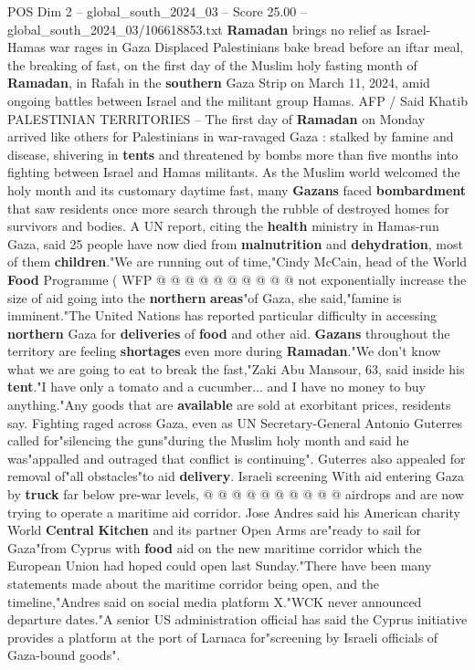 \begin{textsample}{POS Dim 2 – global\_south\_2024\_03 – Score 25.00 – global\_south\_2024\_03/106618853.txt}  \label{ex:f2_pos_016}
\textbf{Ramadan} brings no relief as Israel-Hamas war rages in Gaza Displaced Palestinians bake bread before an iftar meal, the breaking of fast, on the first day of the Muslim holy fasting month of \textbf{Ramadan}, in Rafah in the \textbf{southern} Gaza Strip on March 11, 2024, amid ongoing battles between Israel and the militant group Hamas.
AFP / Said Khatib PALESTINIAN TERRITORIES -- The first day of \textbf{Ramadan} on Monday arrived like others for Palestinians in war-ravaged Gaza : stalked by famine and disease, shivering in \textbf{tents} and threatened by bombs more than five months into fighting between Israel and Hamas militants.
As the Muslim world welcomed the holy month and its customary daytime fast, many \textbf{Gazans} faced \textbf{bombardment} that saw residents once more search through the rubble of destroyed homes for survivors and bodies.
A UN report, citing the \textbf{health} ministry in Hamas-run Gaza, said 25 people have now died from \textbf{malnutrition} and \textbf{dehydration}, most of them \textbf{children}."We are running out of time,"Cindy McCain, head of the World \textbf{Food} Programme ( WFP @ @ @ @ @ @ @ @ @ @ not exponentially increase the size of aid going into the \textbf{northern} \textbf{areas}"of Gaza, she said,"famine is imminent."The United Nations has reported particular difficulty in accessing \textbf{northern} Gaza for \textbf{deliveries} of \textbf{food} and other aid. \textbf{Gazans} throughout the territory are feeling \textbf{shortages} even more during \textbf{Ramadan}."We don't know what we are going to eat to break the fast,"Zaki Abu Mansour, 63, said inside his \textbf{tent}."I have only a tomato and a cucumber... and I have no money to buy anything."Any goods that are \textbf{available} are sold at exorbitant prices, residents say.
Fighting raged across Gaza, even as UN Secretary-General Antonio Guterres called for"silencing the guns"during the Muslim holy month and said he was"appalled and outraged that conflict is continuing".
Guterres also appealed for removal of"all obstacles"to aid \textbf{delivery}.
Israeli screening With aid entering Gaza by \textbf{truck} far below pre-war levels, @ @ @ @ @ @ @ @ @ @ airdrops and are now trying to operate a maritime aid corridor.
Jose Andres said his American charity World \textbf{Central} \textbf{Kitchen} and its partner Open Arms are"ready to sail for Gaza"from Cyprus with \textbf{food} aid on the new maritime corridor which the European Union had hoped could open last Sunday."There have been many statements made about the maritime corridor being open, and the timeline,"Andres said on social media platform X."WCK never announced departure dates."A senior US administration official has said the Cyprus initiative provides a platform at the port of Larnaca for"screening by Israeli officials of Gaza-bound goods".

\end{textsample}
